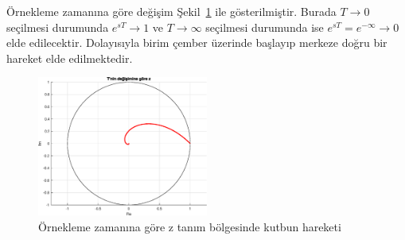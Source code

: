 Örnekleme zamanına göre değişim Şekil~\ref{fig:plot1} ile gösterilmiştir. Burada $T\rightarrow 0$ seçilmesi durumunda $e^{sT}\rightarrow 1$ ve $T\rightarrow \infty$ seçilmesi durumunda ise $e^{sT}=e^{-\infty}\rightarrow 0$ elde edilecektir. Dolayısıyla birim çember üzerinde başlayıp merkeze doğru bir hareket elde edilmektedir.  
\begin{figure}[!htb]
    \centering
    \includegraphics[width=0.5\textwidth]{plot1}
    \caption{Örnekleme zamanına göre z tanım bölgesinde kutbun hareketi}\label{fig:plot1}
\end{figure}